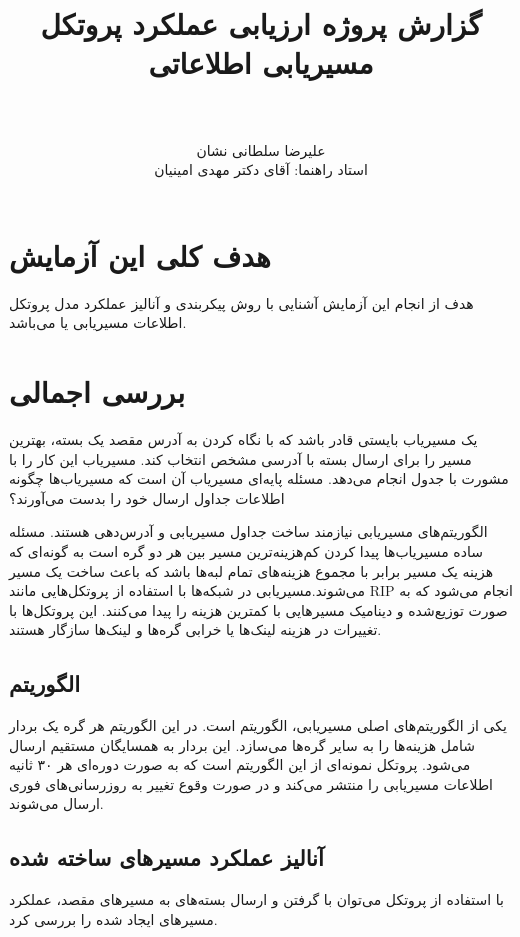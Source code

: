 \documentclass[a4paper]{article}
\title{گزارش پروژه ارزیابی عملکرد پروتکل مسیریابی اطلاعاتی \\ \lr{RIP: Routing
Information Protocol} \\ \small{\lr{A Routing Protocol Based on the
Distance-Vector Algorithm}}}
\author{علیرضا سلطانی نشان \\ \small{استاد راهنما: آقای دکتر مهدی امینیان}}
\begin{document}
\maketitle
\tableofcontents
\listoffigures

\section{هدف کلی این آزمایش}

هدف از انجام این آزمایش آشنایی با روش پیکربندی و آنالیز عملکرد مدل پروتکل
اطلاعات مسیریابی یا  می‌باشد.

\section{بررسی اجمالی}

یک مسیریاب بایستی قادر باشد که با نگاه کردن به آدرس مقصد یک بسته، بهترین مسیر را
برای ارسال بسته با آدرسی مشخص انتخاب کند. مسیریاب این کار را با مشورت با جدول
 انجام می‌دهد. مسئله پایه‌ای مسیریاب آن است که مسیریاب‌ها چگونه
اطلاعات جداول ارسال خود را بدست می‌آورند؟

الگوریتم‌های مسیریابی نیازمند ساخت جداول مسیریابی و آدرس‌دهی هستند. مسئله ساده
مسیریاب‌ها پیدا کردن کم‌هزینه‌ترین مسیر بین هر دو گره است به گونه‌ای که هزینه یک
مسیر برابر با مجموع هزینه‌های تمام لبه‌ها باشد که باعث ساخت یک مسیر
می‌شوند.مسیریابی در شبکه‌ها با استفاده از پروتکل‌هایی مانند RIP انجام می‌شود که
به صورت توزیع‌شده و دینامیک مسیرهایی با کمترین هزینه را پیدا می‌کنند. این
پروتکل‌ها با تغییرات در هزینه لینک‌ها یا خرابی گره‌ها و لینک‌ها سازگار هستند. 

\subsection{الگوریتم }

یکی از الگوریتم‌های اصلی مسیریابی، الگوریتم  است. در این
الگوریتم هر گره یک بردار شامل هزینه‌ها را به سایر گره‌ها می‌سازد. این بردار به
همسایگان مستقیم ارسال می‌شود. پروتکل  نمونه‌ای از این الگوریتم است که به
صورت دوره‌ای هر ۳۰ ثانیه اطلاعات مسیریابی را منتشر  می‌کند  و
در صورت وقوع تغییر  به روزرسانی‌های فوری ارسال می‌شوند.

\subsection{آنالیز عملکرد مسیر‌های ساخته شده}

با استفاده از پروتکل  می‌توان با  گرفتن و ارسال بسته‌های
 به مسیر‌های مقصد، عملکرد مسیر‌های ایجاد شده را بررسی کرد.
\end{document}
